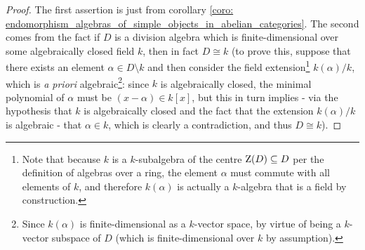                 \begin{proof}
                    The first assertion is just from corollary \ref{coro: endomorphism_algebras_of_simple_objects_in_abelian_categories}. The second comes from the fact if $D$ is a division algebra which is finite-dimensional over some algebraically closed field $k$, then in fact $D \cong k$ (to prove this, suppose that there exists an element $\alpha \in D \setminus k$ and then consider the field extension\footnote{Note that because $k$ is a $k$-subalgebra of the centre $\mathrm{Z}(D) \subseteq D$ per the definition of algebras over a ring, the element $\alpha$ must commute with all elements of $k$, and therefore $k(\alpha)$ is actually a $k$-algebra that is a field by construction.} $k(\alpha)/k$, which is \textit{a priori} algebraic\footnote{Since $k(\alpha)$ is finite-dimensional as a $k$-vector space, by virtue of being a $k$-vector subspace of $D$ (which is finite-dimensional over $k$ by assumption).}: since $k$ is algebraically closed, the minimal polynomial of $\alpha$ must be $(x - \alpha) \in k[x]$, but this in turn implies - via the hypothesis that $k$ is algebraically closed and the fact that the extension $k(\alpha)/k$ is algebraic - that $\alpha \in k$, which is clearly a contradiction, and thus $D \cong k$).
                \end{proof}
                
